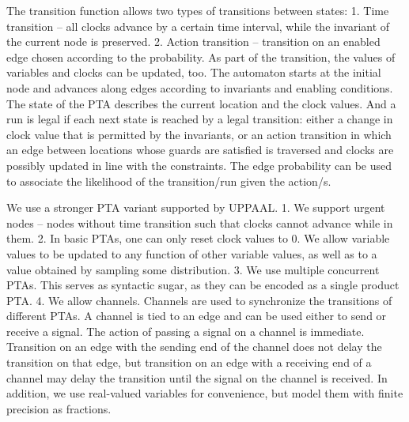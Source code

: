 \documentclass[letterpaper]{article}
\begin{document}
The transition function allows two types of transitions between states: 1. Time transition -- all clocks advance by a certain time interval, while the invariant of the current node is preserved. 2. Action transition -- transition on an enabled edge chosen according to the probability. As part of the transition, the values of variables and clocks can be updated, too. The automaton starts at the initial node and advances along edges according to invariants and enabling conditions. The state of the PTA describes the current location and the clock values. And a run is legal if each next state is reached by a legal transition: either a change in clock value that is permitted by the invariants, or an action transition in which an edge between locations
whose guards are satisfied is traversed and clocks are possibly updated in line with the constraints. The edge probability can be used to associate the likelihood of the transition/run given the action/s.



We use a stronger  PTA variant
supported by UPPAAL. 1. We support urgent nodes -- nodes without time transition such that clocks cannot advance while in them. 2. In basic PTAs, one can only reset clock values to 0. We allow variable values to be updated to any function of other variable values, as well as to a value obtained by sampling some distribution. 3. We use multiple concurrent PTAs. This serves as syntactic sugar,
as they can be encoded as a single product PTA. 4. We allow channels. Channels are used to synchronize the transitions of different PTAs. A channel is tied to an edge and can be used either to send or receive a signal. The action of passing a signal on a channel is immediate. Transition on an edge with the sending end of the channel does not delay the transition on that edge, but transition on an edge with a receiving end of a channel may delay the transition until the signal on the channel is received. In addition, we use real-valued variables for convenience, but model them with finite precision as fractions. 
\end{document}

